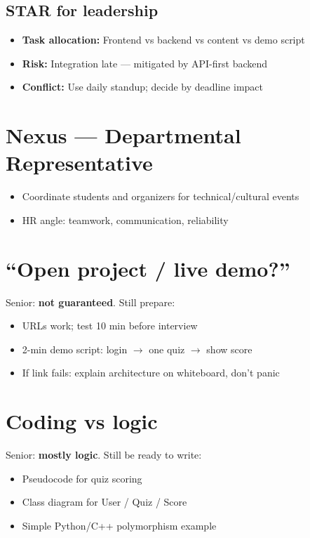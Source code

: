 \documentclass[11pt,a4paper]{article}
\begin{document}
\subsection{STAR for leadership}
\begin{itemize}
  \item \textbf{Task allocation:} Frontend vs backend vs content vs demo script
  \item \textbf{Risk:} Integration late --- mitigated by API-first backend
  \item \textbf{Conflict:} Use daily standup; decide by deadline impact
\end{itemize}

\section{Nexus --- Departmental Representative}
\begin{itemize}
  \item Coordinate students and organizers for technical/cultural events
  \item HR angle: teamwork, communication, reliability
\end{itemize}

\section{``Open project / live demo?''}
Senior: \textbf{not guaranteed}. Still prepare:
\begin{itemize}
  \item URLs work; test 10 min before interview
  \item 2-min demo script: login $\rightarrow$ one quiz $\rightarrow$ show score
  \item If link fails: explain architecture on whiteboard, don't panic
\end{itemize}

\section{Coding vs logic}
Senior: \textbf{mostly logic}. Still be ready to write:
\begin{itemize}
  \item Pseudocode for quiz scoring
  \item Class diagram for User / Quiz / Score
  \item Simple Python/C++ polymorphism example
\end{itemize}
\end{document}
